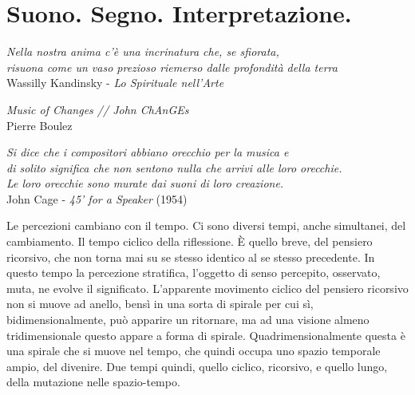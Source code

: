 
\section{Suono. Segno. Interpretazione.}

	\begin{flushright}
		\textit{Nella nostra anima c'\`e una incrinatura che, se sfiorata, \\
		risuona come un vaso prezioso riemerso dalle profondit\`a della terra} \\
		Wassilly Kandinsky - \emph{Lo Spirituale nell'Arte}
	\end{flushright}

	\begin{flushright}
		\textit{Music of Changes // John ChAnGEs} \\
		Pierre Boulez
	\end{flushright}

	\begin{flushright}
		\textit{Si dice che i compositori abbiano orecchio per la musica e \\
		di solito significa che non sentono nulla che arrivi alle loro orecchie. \\
		Le loro orecchie sono murate dai suoni di loro creazione.} \\
		John Cage - \emph{45' for a Speaker} (1954)
	\end{flushright}

\bigskip


Le percezioni cambiano con il tempo. Ci sono diversi tempi, anche simultanei, del
cambiamento. Il tempo ciclico della riflessione. È quello breve, del pensiero
ricorsivo, che non torna mai su se stesso identico al se stesso precedente. In
questo tempo la percezione stratifica, l'oggetto di senso percepito, osservato,
muta, ne evolve il significato. L'apparente movimento ciclico del pensiero
ricorsivo non si muove ad anello, bensì in una sorta di spirale per cui sì,
bidimensionalmente, può apparire un ritornare, ma ad una visione almeno
tridimensionale questo appare a forma di spirale. Quadrimensionalmente questa è
una spirale che si muove nel tempo, che quindi occupa uno spazio temporale ampio,
del divenire. Due tempi quindi, quello ciclico, ricorsivo, e quello lungo, della
mutazione nelle spazio-tempo.

